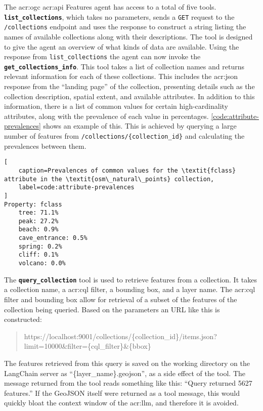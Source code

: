 The \acrshort{acr:ogc} \acrshort{acr:api} Features agent has access to a total of five tools. \textbf{\texttt{list\_collections}}, which takes no parameters, sends a \texttt{GET} request to the \texttt{/collections} endpoint and uses the response to construct a string listing the names of available collections along with their descriptions. The tool is designed to give the agent an overview of what kinds of data are available. Using the response from \texttt{list\_collections} the agent can now invoke the \textbf{\texttt{get\_collections\_info}}. This tool takes a list of collection names and returns relevant information for each of these collections. This includes the \acrshort{acr:json} response from the \enquote{landing page} of the collection, presenting details such as the collection description, spatial extent, and available attributes. In addition to this information, there is a list of common values for certain high-cardinality attributes, along with the prevalence of each value in percentages. \autoref{code:attribute-prevalences} shows an example of this. This is achieved by querying a large number of features from \texttt{/collections/\{collection\_id\}} and calculating the prevalences between them.

\begin{lstlisting}[
    caption=Prevalences of common values for the \textit{fclass} attribute in the \textit{osm\_natural\_points} collection,
    label=code:attribute-prevalences
]
Property: fclass
    tree: 71.1%
    peak: 27.2%
    beach: 0.9%
    cave_entrance: 0.5%
    spring: 0.2%
    cliff: 0.1%
    volcano: 0.0%
\end{lstlisting}

The \textbf{\texttt{query\_collection}} tool is used to retrieve features from a collection. It takes a collection name, a \acrshort{acr:cql} filter, a bounding box, and a layer name. The \acrshort{acr:cql} filter and bounding box allow for retrieval of a subset of the features of the collection being queried. Based on the parameters an URL like this is constructed:

\begin{quote}
    https://localhost:9001/collections/\{collection\_id\}/items.json?limit=10000\&filter=\{cql\_filter\}\&\{bbox\}
\end{quote}

The features retrieved from this query is saved on the working directory on the LangChain server as \enquote{\{layer\_name\}.geojson}, as a side effect of the tool. The message returned from the tool reads something like this: \enquote{Query returned 5627 features.} If the GeoJSON itself were returned as a tool message, this would quickly bloat the context window of the \acrshort{acr:llm}, and therefore it is avoided.

